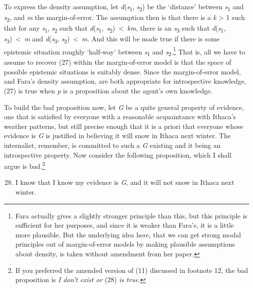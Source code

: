 To express the density assumption, let
\emph{d}(\emph{s}\textsubscript{1}, \emph{s}\textsubscript{2}) be the
`distance' between \emph{s}\textsubscript{1} and
\emph{s}\textsubscript{2}, and \emph{m} the margin-of-error. The
assumption then is that there is a \emph{k} {\textgreater{}} 1 such that
for any \emph{s}\textsubscript{1}, \emph{s}\textsubscript{2} such that
\emph{d}(\emph{s}\textsubscript{1},~\emph{s}\textsubscript{2})~{\textless{}}~\emph{km},
there is an \emph{s}\textsubscript{3} such that
\emph{d}(\emph{s}\textsubscript{1},
\emph{s}\textsubscript{3})~{\textless{}}~\emph{m} and
\emph{d}(\emph{s}\textsubscript{3},
\emph{s}\textsubscript{2})~{\textless{}}~\emph{m}. And this will be made
true if there is some epistemic situation roughly `half-way' between
\emph{s}\textsubscript{1} and \emph{s}\textsubscript{2}.\footnote{Fara
  actually gives a slightly stronger principle than this, but this
  principle is sufficient for her purposes, and since it is weaker than
  Fara's, it is a little more plausible. But the underlying idea here,
  that we can get strong modal principles out of margin-of-error models
  by making plausible assumptions about density, is taken without
  amendment from her paper.} That is, all we have to assume to recover
(27) within the margin-of-error model is that the space of possible
epistemic situations is suitably dense. Since the margin-of-error model,
and Fara's density assumption, are both appropriate for introspective
knowledge, (27) is true when \emph{p} is a proposition about the agent's
own knowledge.

To build the bad proposition now, let \emph{G} be a quite general
property of evidence, one that is satisfied by everyone with a
reasonable acquaintance with Ithaca's weather patterns, but still
precise enough that it is a priori that everyone whose evidence is
\emph{G} is justified in believing it will snow in Ithaca next winter.
The internalist, remember, is committed to such a \emph{G} existing and
it being an introspective property. Now consider the following
proposition, which I shall argue is bad.\footnote{If you preferred the
  amended version of (11) discussed in footnote 12, the bad proposition
  is \emph{I don't exist or} (28) \emph{is true}.}

\begin{enumerate}
\setcounter{enumi}{27}
\item
  I know that I know my evidence is \emph{G}, and it will not snow in
  Ithaca next winter.
\end{enumerate}

